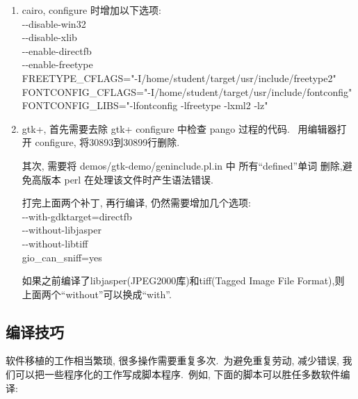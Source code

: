 \begin{enumerate}
  \item cairo,  configure 时增加以下选项:\\
      -{}-disable-win32 \\
      -{}-disable-xlib \\
      -{}-enable-directfb \\
      -{}-enable-freetype \\
      FREETYPE\_CFLAGS="-I/home/student/target/usr/include/freetype2" \\
      FONTCONFIG\_CFLAGS="-I/home/student/target/usr/include/fontconfig" \\
      FONTCONFIG\_LIBS="-lfontconfig -lfreetype -lxml2 -lz"

  \item gtk+, 首先需要去除 gtk+ configure 中检查 pango 过程的代码.
      ~用编辑器打开 configure, 将30893到30899行删除.

     其次, 需要将 demos/gtk-demo/geninclude.pl.in 中 所有``defined''单词
     删除,避免高版本 perl 在处理该文件时产生语法错误.

     打完上面两个补丁, 再行编译, 仍然需要增加几个选项:\\
      -{}-with-gdktarget=directfb \\
      -{}-without-libjasper \\
      -{}-without-libtiff \\
      gio\_can\_sniff=yes

      如果之前编译了libjasper(JPEG2000库)和tiff(Tagged Image File Format),则
      上面两个``without''可以换成``with''.
\end{enumerate}

\subsection{编译技巧}
    软件移植的工作相当繁琐, 很多操作需要重复多次.~为避免重复劳动, 减少错误,
我们可以把一些程序化的工作写成脚本程序.~例如, 下面的脚本可以胜任多数软件编译:

